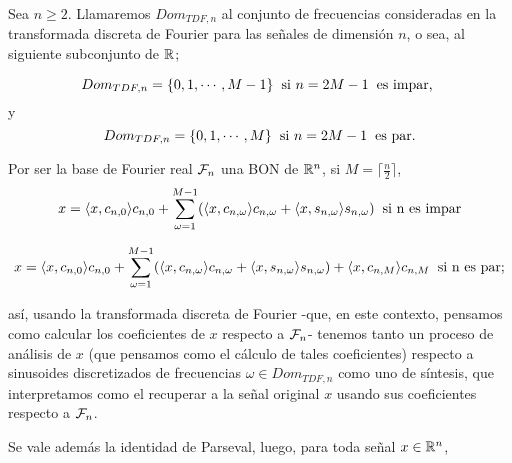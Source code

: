 \begin{defi}
\label{def. Dom tdf}
Sea $n \geq 2$. Llamaremos $Dom_{TDF, n}$ al conjunto de frecuencias
consideradas en la transformada discreta de Fourier para
las señales de dimensión $n$, o sea, al siguiente subconjunto de $\mathbb{R}$;

\[
Dom_{TDF, n} = \{ 0 , 1, \cdots, M-1 \}
\hspace{0.2cm} \text{si } n = 2M-1
\hspace{0.2cm}
\text{es impar, }
\]
y
\[
Dom_{TDF, n} = \{ 0 , 1, \cdots, M \}
\hspace{0.2cm} \text{si } n = 2M-1
\hspace{0.2cm}
\text{es par.}
\]
\end{defi}


\begin{nota}
\label{nota: ya?}
Por ser 
la base de Fourier real
$\mathcal{F}_{n}$ una BON de $\mathbb{R}^{n}$, 
si $M = \lceil \frac{n}{2} \rceil$,
\begin{equation}
\label{ec: sintesis 0}
x = \langle x , c_{n, 0} \rangle c_{n, 0} + \sum\limits_{\omega = 1}^{M-1}(
\langle x , c_{n, \omega} \rangle c_{n, \omega} + 
\langle x , s_{n, \omega} \rangle s_{n, \omega} )
\hspace{0.2cm} \text{si n es impar}
\end{equation}

\begin{equation}
\label{ec: sintesis 1}
x = \langle x , c_{n, 0} \rangle c_{n, 0} + \sum\limits_{\omega = 1}^{M-1}(
\langle x , c_{n, \omega} \rangle  c_{n, \omega} + \langle x , s_{n, \omega} \rangle
s_{n, \omega} )
+ \langle x , c_{n, M} \rangle c_{n, M} 
\hspace{0.2cm} \text{si n es par;}
\end{equation}

así, usando la transformada discreta de Fourier
-que, en este contexto, pensamos como calcular
los coeficientes de $x$ respecto a $\mathcal{F}_{n}$- 
tenemos tanto
un proceso de análisis de $x$ (que pensamos como
el cálculo de tales coeficientes)
respecto a sinusoides discretizados
de frecuencias $\omega \in Dom_{TDF, n}$
como uno de síntesis, que interpretamos como
el recuperar a la señal original $x$ usando
sus coeficientes respecto a $\mathcal{F}_{n}$.
\end{nota}

Se vale además la
identidad de Parseval, luego, para toda
señal $x \in \mathbb{R}^{n}$,

